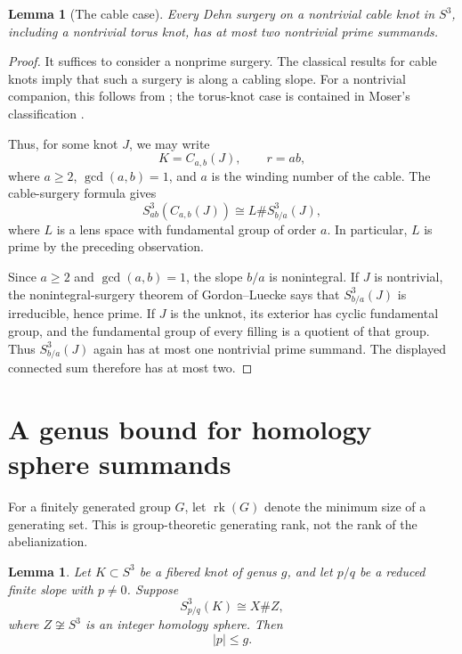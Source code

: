 \documentclass[11pt]{article}
\newcommand{\surg}[2]{S^3_{#1}(#2)}
\DeclareMathOperator{\rk}{rk}
\newtheorem{lemma}[theorem]{Lemma}
\begin{document}
\begin{lemma}[The cable case]\label{lem:cable}
Every Dehn surgery on a nontrivial cable knot in \(S^3\), including a
nontrivial torus knot, has at most two nontrivial prime summands.
\end{lemma}

\begin{proof}
It suffices to consider a nonprime surgery. The classical results for
cable knots imply that such a surgery is along a cabling slope.
For a nontrivial companion, this follows from
\cite[Corollary~4.4 and the proof of Corollary~4.5]{Scharlemann};
the torus-knot case is contained in Moser's classification
\cite{Moser}.

Thus, for some knot \(J\), we may write
\[
    K=C_{a,b}(J),\qquad r=ab,
\]
where \(a\geq 2\), \(\gcd(a,b)=1\), and \(a\) is the winding number
of the cable. The cable-surgery formula
\cite[Corollary~7.3]{Gordon} gives
\[
    \surg{ab}{C_{a,b}(J)}
       \cong L\#\surg{b/a}{J},
\]
where \(L\) is a lens space with fundamental group of order \(a\).
In particular, \(L\) is prime by the preceding observation.

Since \(a\geq 2\) and \(\gcd(a,b)=1\), the slope \(b/a\) is
nonintegral. If \(J\) is nontrivial, the nonintegral-surgery theorem of
Gordon--Luecke \cite{GordonLuecke} says that
\(\surg{b/a}{J}\) is irreducible, hence prime.
If \(J\) is the unknot, its exterior has cyclic fundamental group,
and the fundamental group of every filling is a quotient of that
group. Thus \(\surg{b/a}{J}\) again has at most one nontrivial prime
summand. The displayed connected sum therefore has at most two.
\end{proof}

\section{A genus bound for homology sphere summands}

For a finitely generated group \(G\), let \(\rk(G)\) denote the
minimum size of a generating set. This is group-theoretic generating
rank, not the rank of the abelianization.

\begin{lemma}\label{lem:genus}
Let \(K\subset S^3\) be a fibered knot of genus \(g\), and let
\(p/q\) be a reduced finite slope with \(p\neq 0\).
Suppose
\[
    \surg{p/q}{K}\cong X\# Z,
\]
where \(Z\not\cong S^3\) is an integer homology sphere.
Then
\[
    |p|\leq g.
\]
\end{lemma}
\end{document}

